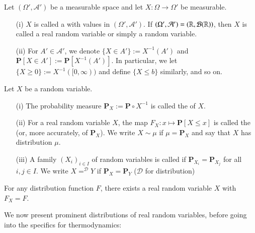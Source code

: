 \documentclass[12pt, a4paper, oneside, openright, titlepage]{book}
\begin{document}
\begin{defn}
    Let $(\Omega',\mathcal{A}')$ be a measurable space and let $X:\Omega\rightarrow \Omega'$ be measurable. \begin{itemize}
        \item[(i)] $X$ is called a  with values in $(\Omega',\mathcal{A}')$. If $(\Omega',\mathcal{A}') = (\mathbb R,\mathcal{B}(\mathbb R))$, then $X$ is called a real random variable or simply a random variable.
        \item[(ii)] For $A' \in \mathcal{A}'$, we denote $\{X \in A'\} := X^{-1}(A')$ and $\mathbf{P}[X\in A'] := \mathbf{P}[X^{-1}(A')]$. In particular, we let $\{X\geq 0\} := X^{-1}([0,\infty))$ and define $\{X\leq b\}$ similarly, and so on.
    \end{itemize}
\end{defn}

\begin{defn}[Distributions]
    Let $X$ be a random variable. \begin{itemize}
        \item[(i)] The probability measure $\mathbf{P}_X := \mathbf{P}\circ X^{-1}$ is called the  of $X$.
        \item[(ii)] For a real random variable $X$, the map $F_X:x\mapsto \mathbf{P}[X\leq x]$ is called the  (or, more accurately, of $\mathbf{P}_X$). We write $X\sim \mu$ if $\mu = \mathbf{P}_X$ and say that $X$ has distribution $\mu$.
        \item[(iii)] A family $(X_i)_{i \in I}$ of random variables is called  if $\mathbf{P}_{X_i} = \mathbf{P}_{X_j}$ for all $i,j \in I$. We write $X =^{\mathcal{D}} Y$ if $\mathbf{P}_X = \mathbf{P}_Y$ ($\mathcal{D}$ for distribution)
    \end{itemize}
\end{defn}

\begin{thm}
    For any distribution function $F$, there exists a real random variable $X$ with $F_X = F$.
\end{thm}

We now present prominent distributions of real random variables, before going into the specifics for thermodynamics:
\end{document}
